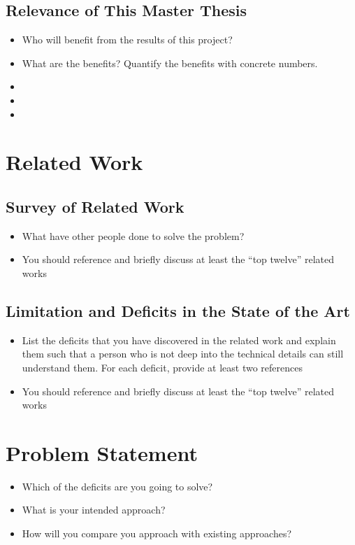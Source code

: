 \documentclass[thesis]{mas_proposal}
\begin{document}
\begin{itemize}
\end{itemize}

\subsection{Relevance of This Master Thesis}
\begin{itemize}
    \item Who will benefit from the results of this project?
    \item What are the benefits? Quantify the benefits with concrete numbers.
    \item 
    \item 
    \item 
 \end{itemize}

\section{Related Work}

\subsection{Survey of Related Work}
\begin{itemize}
    \item What have other people done to solve the problem?
    \item You should reference and briefly discuss at least the ``top twelve'' related works
\end{itemize}

\subsection{Limitation and Deficits in the State of the Art}
\begin{itemize}
    \item List the deficits that you have discovered in the related work and explain them such that a person who is not deep into the technical details can still understand them.
    For each deficit, provide at least two references
    \item You should reference and briefly discuss at least the ``top twelve'' related works
\end{itemize}

\section{Problem Statement}
\begin{itemize}
    \item Which of the deficits are you going to solve?
    \item What is your intended approach?
    \item How will you compare you approach with existing approaches?
\end{itemize}
\end{document}

